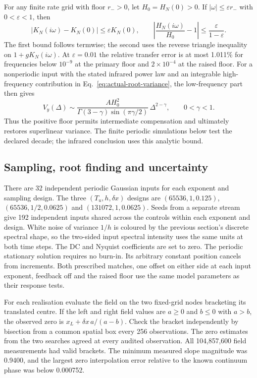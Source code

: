 \documentclass[11pt]{article}
\begin{document}
For any finite rate grid with floor \(r_->0\), let \(H_0=H_N(0)>0\).
If \(|\omega|\le\varepsilon r_-\) with \(0<\varepsilon<1\), then
\[
 |K_N(i\omega)-K_N(0)|\le\varepsilon K_N(0),\qquad
 \left|\frac{H_N(i\omega)}{H_0}-1\right|
 \le\frac{\varepsilon}{1-\varepsilon}.
\]
The first bound follows termwise; the second uses the reverse triangle
inequality on \(1+gK_N(i\omega)\). At \(\varepsilon=0.01\) the relative
transfer error is at most 1.011\% for frequencies below \(10^{-9}\) at
the primary floor and \(2\times10^{-4}\) at the raised floor.
For a nonperiodic input with the stated infrared power law and an
integrable high-frequency contribution in Eq.~\eqref{eq:actual-root-variance},
the low-frequency part then gives
\[
 V_y(\Delta)\sim
 \frac{A H_0^2}{\Gamma(3-\gamma)\sin(\pi\gamma/2)}\,
 \Delta^{2-\gamma},\qquad 0<\gamma<1 .
\]
Thus the positive floor permits intermediate compensation and ultimately
restores superlinear variance. The finite periodic simulations below
test the declared decade; the infrared conclusion uses this analytic bound.

\subsection{Sampling, root finding and uncertainty}
There are 32 independent periodic Gaussian inputs for each exponent and
sampling design. The three \((T_u,h,\delta x)\) designs are
\((65536,1,0.125)\), \((65536,1/2,0.0625)\) and
\((131072,1,0.0625)\). Seeds from a separate stream give 192 independent
inputs shared across the controls within each exponent and design. White
noise of variance \(1/h\) is coloured by the previous section's discrete
spectral shape, so the two-sided input spectral intensity uses the same
units at both time steps. The DC and Nyquist coefficients are set to zero.
The periodic stationary solution requires no burn-in. Its arbitrary
constant position cancels from increments. Both prescribed matches,
one offset on either side at each input exponent, feedback off and
the raised floor use the same model parameters as their response tests.

For each realisation evaluate the field on the two fixed-grid nodes
bracketing its translated centre. If the left and right field values are
\(a\ge0\) and \(b\le0\) with \(a>b\), the observed zero is
\(x_L+\delta x\,a/(a-b)\). Check the bracket independently by bisection
from a common spatial box every 256 observations. The zero estimates from
the two searches agreed at every audited observation. All 104,857,600
field measurements had valid brackets. The minimum measured slope
magnitude was 0.9400, and the largest zero interpolation error relative
to the known continuum phase was below 0.000752.
\end{document}
